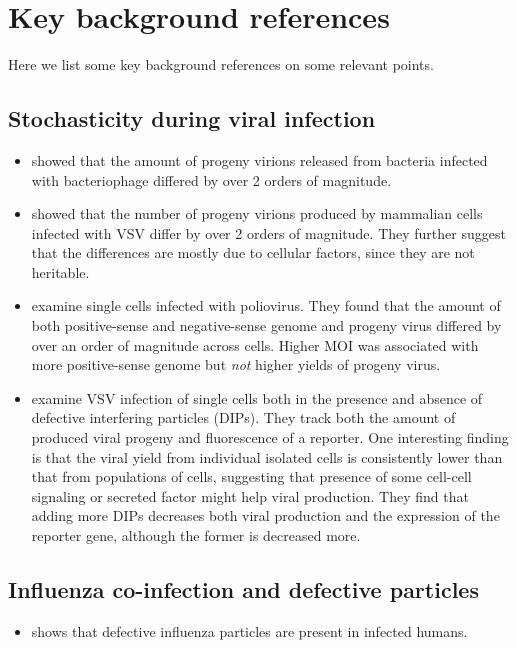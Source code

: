 \documentclass[9pt,lineno]{elife}
\begin{document}
\section{Key background references}
Here we list some key background references on some relevant points.

\subsection{Stochasticity during viral infection}
\begin{itemize}

\item \citet{delbruck1945burst} showed that the amount of progeny virions released from bacteria infected with bacteriophage differed by over 2 orders of magnitude.

\item \citet{zhu2009growth} showed that the number of progeny virions produced by mammalian cells infected with VSV differ by over 2 orders of magnitude. 
They further suggest that the differences are mostly due to cellular factors, since they are not heritable.

\item \citet{schulte2014single} examine single cells infected with poliovirus.
They found that the amount of both positive-sense and negative-sense genome and progeny virus differed by over an order of magnitude across cells.
Higher MOI was associated with more positive-sense genome but \emph{not} higher yields of progeny virus.

\item \citet{akpinar2016high} examine VSV infection of single cells both in the presence and absence of defective interfering particles (DIPs). 
They track both the amount of produced viral progeny and fluorescence of a reporter.
One interesting finding is that the viral yield from individual isolated cells is consistently lower than that from populations of cells, suggesting that presence of some cell-cell signaling or secreted factor might help viral production.
They find that adding more DIPs decreases both viral production and the expression of the reporter gene, although the former is decreased more.

\end{itemize}

\subsection{Influenza co-infection and defective particles}
\begin{itemize}

\item \citet{saira2013sequence} shows that defective influenza particles are present in infected humans.

\end{itemize}
\end{document}
